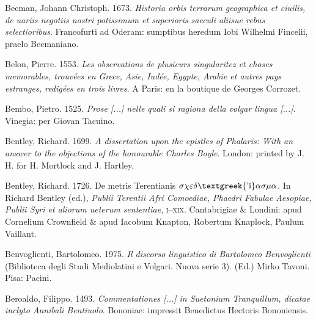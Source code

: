 \begin{styleStandard}
Becman, Johann Christoph. 1673. \textit{Historia orbis terrarum geographica et ciuilis, de uariis negotiis nostri potissimum et superioris saeculi aliisue rebus selectioribus}. Francofurti ad Oderam: sumptibus heredum Iobi Wilhelmi Fincelii, praelo Becmaniano.
\end{styleStandard}

\begin{styleStandard}
Belon, Pierre. 1553. \textit{Les observations de plusieurs singularitez et choses memorables, trouvées en Grece, Asie, Iudée, Egypte, Arabie et autres pays estranges, redigées en trois livres}. A Paris: en la boutique de Georges Corrozet.
\end{styleStandard}

\begin{styleStandard}
Bembo, Pietro. 1525. \textit{Prose [...] nelle quali si ragiona della volgar lingua [...]}. Vinegia: per Giovan Tacuino.
\end{styleStandard}

\begin{styleStandard}
Bentley, Richard. 1699. \textit{A dissertation upon the epistles of Phalaris: With an answer to the objections of the honourable Charles Boyle}. London: printed by J. H. for H. Mortlock and J. Hartley.
\end{styleStandard}

\begin{styleStandard}
Bentley, Richard. 1726. De metris Terentianis $\sigma \chi \varepsilon \delta \text{\textgreek{'i}}\alpha \sigma \mu \alpha $. In Richard Bentley (ed.), \textit{Publii Terentii Afri Comoediae, Phaedri Fabulae Aesopiae, Publii Syri et aliorum ueterum sententiae}, \textsc{i}–\textsc{xix}. Cantabrigiae \& Londini: apud Cornelium Crownfield \& apud Iacobum Knapton, Robertum Knaplock, Paulum Vaillant.
\end{styleStandard}

\begin{styleStandard}
Benvoglienti, Bartolomeo. 1975. \textit{Il discorso linguistico di Bartolomeo Benvoglienti} (Biblioteca degli Studi Mediolatini e Volgari. Nuova serie 3). (Ed.) Mirko Tavoni. Pisa: Pacini.
\end{styleStandard}

\begin{styleStandard}
Beroaldo, Filippo. 1493. \textit{Commentationes [...] in Suetonium Tranquillum, dicatae inclyto Annibali Bentiuolo}. Bononiae: impressit Benedictus Hectoris Bononiensis.
\end{styleStandard}

